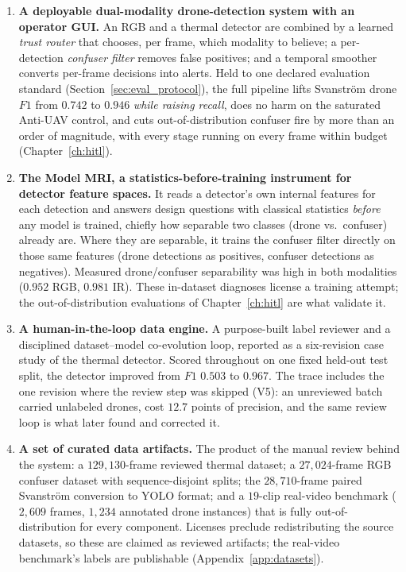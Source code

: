 \begin{enumerate}
    \item \textbf{A deployable dual-modality drone-detection system with an operator GUI.} An RGB and a thermal detector are combined by a learned \emph{trust router} that chooses, per frame, which modality to believe; a per-detection \emph{confuser filter} removes false positives; and a temporal smoother converts per-frame decisions into alerts. Held to one declared evaluation standard (Section~\ref{sec:eval_protocol}), the full pipeline lifts Svanstr\"om drone $F1$ from $0.742$ to $0.946$ \emph{while raising recall}, does no harm on the saturated Anti-UAV control, and cuts out-of-distribution confuser fire by more than an order of magnitude, with every stage running on every frame within budget (Chapter~\ref{ch:hitl}).
    \item \textbf{The Model MRI, a statistics-before-training instrument for detector feature spaces.} It reads a detector's own internal features for each detection and answers design questions with classical statistics \emph{before} any model is trained, chiefly how separable two classes (drone vs.\ confuser) already are. Where they are separable, it trains the confuser filter directly on those same features (drone detections as positives, confuser detections as negatives). Measured drone/confuser separability was high in both modalities ($0.952$ RGB, $0.981$ IR). These in-dataset diagnoses license a training attempt; the out-of-distribution evaluations of Chapter~\ref{ch:hitl} are what validate it.
    \item \textbf{A human-in-the-loop data engine.} A purpose-built label reviewer and a disciplined dataset--model co-evolution loop, reported as a six-revision case study of the thermal detector. Scored throughout on one fixed held-out test split, the detector improved from $F1$ $0.503$ to $0.967$. The trace includes the one revision where the review step was skipped (V5): an unreviewed batch carried unlabeled drones, cost $12.7$ points of precision, and the same review loop is what later found and corrected it.
    \item \textbf{A set of curated data artifacts.} The product of the manual review behind the system: a $129{,}130$-frame reviewed thermal dataset; a $27{,}024$-frame RGB confuser dataset with sequence-disjoint splits; the $28{,}710$-frame paired Svanstr\"om conversion to YOLO format; and a $19$-clip real-video benchmark ($2{,}609$ frames, $1{,}234$ annotated drone instances) that is fully out-of-distribution for every component. Licenses preclude redistributing the source datasets, so these are claimed as reviewed artifacts; the real-video benchmark's labels are publishable (Appendix~\ref{app:datasets}).

\end{enumerate}
